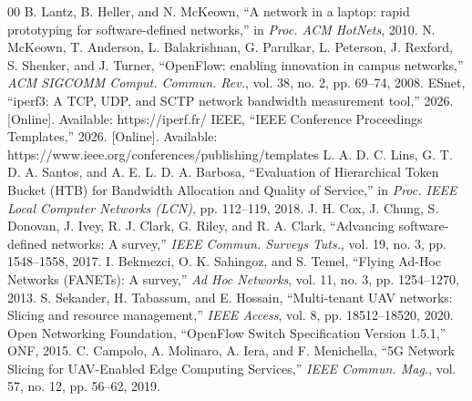 \documentclass[conference]{IEEEtran}
\begin{document}
\begin{thebibliography}{00}
 B. Lantz, B. Heller, and N. McKeown, ``A network in a laptop: rapid prototyping for software-defined networks,'' in \textit{Proc. ACM HotNets}, 2010.
 N. McKeown, T. Anderson, L. Balakrishnan, G. Parulkar, L. Peterson, J. Rexford, S. Shenker, and J. Turner, ``OpenFlow: enabling innovation in campus networks,'' \textit{ACM SIGCOMM Comput. Commun. Rev.}, vol. 38, no. 2, pp. 69--74, 2008.
 ESnet, ``iperf3: A TCP, UDP, and SCTP network bandwidth measurement tool,'' 2026. [Online]. Available: https://iperf.fr/
 IEEE, ``IEEE Conference Proceedings Templates,'' 2026. [Online]. Available: https://www.ieee.org/conferences/publishing/templates
 L. A. D. C. Lins, G. T. D. A. Santos, and A. E. L. D. A. Barbosa, ``Evaluation of Hierarchical Token Bucket (HTB) for Bandwidth Allocation and Quality of Service,'' in \textit{Proc. IEEE Local Computer Networks (LCN)}, pp. 112--119, 2018.
 J. H. Cox, J. Chung, S. Donovan, J. Ivey, R. J. Clark, G. Riley, and R. A. Clark, ``Advancing software-defined networks: A survey,'' \textit{IEEE Commun. Surveys Tuts.}, vol. 19, no. 3, pp. 1548--1558, 2017.
 I. Bekmezci, O. K. Sahingoz, and S. Temel, ``Flying Ad-Hoc Networks (FANETs): A survey,'' \textit{Ad Hoc Networks}, vol. 11, no. 3, pp. 1254--1270, 2013.
 S. Sekander, H. Tabassum, and E. Hossain, ``Multi-tenant UAV networks: Slicing and resource management,'' \textit{IEEE Access}, vol. 8, pp. 18512--18520, 2020.
 Open Networking Foundation, ``OpenFlow Switch Specification Version 1.5.1,'' ONF, 2015.
 C. Campolo, A. Molinaro, A. Iera, and F. Menichella, ``5G Network Slicing for UAV-Enabled Edge Computing Services,'' \textit{IEEE Commun. Mag.}, vol. 57, no. 12, pp. 56--62, 2019.
\end{thebibliography}
\end{document}
